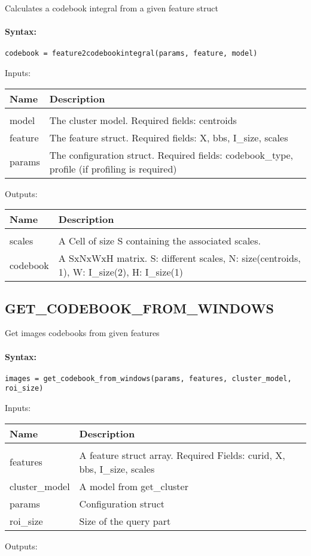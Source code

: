 Calculates a codebook integral from a given feature struct

\paragraph{Syntax:} \verb|codebook = feature2codebookintegral(params, feature, model)|

Inputs:

\begin{tabular}{|l|p{5cm}|}
\hline
\textbf{Name} & \textbf{Description} \\
\hline \hline \\
model & The cluster model. Required fields: centroids  \\ \hline
feature & The feature struct. Required fields: X, bbs, I\_size, scales  \\ \hline
params & The configuration struct. Required fields: codebook\_type, profile (if profiling is required)  \\ \hline
\end{tabular}
Outputs:

\begin{tabular}{|l|p{5cm}|}
\hline
\textbf{Name} & \textbf{Description} \\
\hline \hline \\
scales & A Cell of size S containing the associated scales.  \\ \hline
codebook & A SxNxWxH matrix. S: different scales, N: size(centroids, 1), W: I\_size(2), H: I\_size(1)  \\ \hline
\end{tabular}

\subsection{GET\_CODEBOOK\_FROM\_WINDOWS}

Get images codebooks from given features

\paragraph{Syntax:} \verb|images = get_codebook_from_windows(params, features, cluster_model, roi_size)|

Inputs:

\begin{tabular}{|l|p{5cm}|}
\hline
\textbf{Name} & \textbf{Description} \\
\hline \hline \\
features & A feature struct array. Required Fields: curid, X, bbs, I\_size, scales  \\ \hline
cluster\_model & A model from get\_cluster  \\ \hline
params & Configuration struct  \\ \hline
roi\_size & Size of the query part  \\ \hline
\end{tabular}
Outputs:

